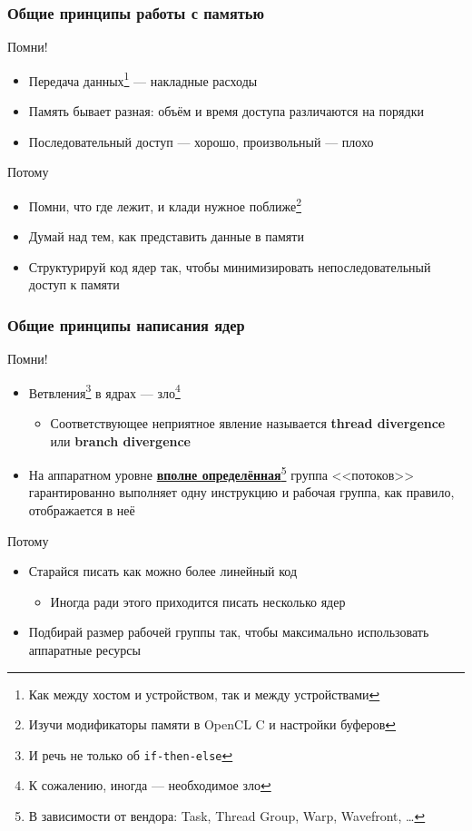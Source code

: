 \documentclass[xcolor=table,aspectratio=169]{beamer}
\begin{document}
\begin{frame}[fragile]
  \frametitle{Общие принципы работы с памятью}
  Помни!
  \begin{itemize}
    \item Передача данных\footnote{Как между хостом и устройством, так и между устройствами} --- накладные расходы
    \item Память бывает разная: объём и время доступа различаются на порядки
    \item Последовательный доступ --- хорошо, произвольный --- плохо
  \end{itemize}
  Потому
  \begin{itemize}
    \item Помни, что где лежит, и клади нужное поближе\footnote{Изучи модификаторы памяти в OpenCL C и настройки буферов}
    \item Думай над тем, как представить данные в памяти
    \item Структурируй код ядер так, чтобы минимизировать непоследовательный доступ к памяти
  \end{itemize}
\end{frame}

\begin{frame}[fragile]
  \frametitle{Общие принципы написания ядер}
  Помни!
  \begin{itemize}
    \item Ветвления\footnote{И речь не только об \texttt{if-then-else}} в ядрах --- зло\footnote{К сожалению, иногда --- необходимое зло} 
    \begin{itemize}
      \item Соответствующее неприятное явление называется \textbf{thread divergence} или \textbf{branch divergence}
    \end{itemize}
    \item На аппаратном уровне \underline{\textbf{вполне определённая}}\footnote{В зависимости от вендора: Task, Thread Group, Warp, Wavefront, \ldots} группа <<потоков>> гарантированно выполняет одну инструкцию и рабочая группа, как правило, отображается в неё
  \end{itemize}
  Потому
  \begin{itemize}
    \item Старайся писать как можно более линейный код
    \begin{itemize}
      \item Иногда ради этого приходится писать несколько ядер
    \end{itemize}
    \item Подбирай размер рабочей группы так, чтобы максимально использовать аппаратные ресурсы
  \end{itemize}
\end{frame}
\end{document}
